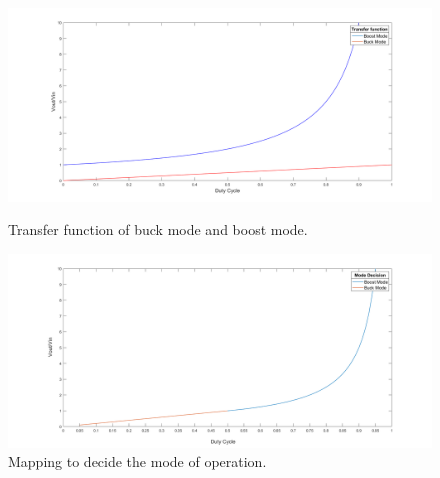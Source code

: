 \begin{figure}[H]
	\begin{minipage}[b]{0.8\linewidth}
		\centering
		\includegraphics[width=\textwidth]{../Pictures/transfer_function_buck_boost_mode}
		\caption{Transfer function of buck mode and boost mode.}
		\label{fig:tfmodes}
	\end{minipage}
	\hspace{0.5cm}
	\begin{minipage}[b]{0.8\linewidth}
		\centering
		\includegraphics[width=\textwidth]{../Pictures/Mode_decision_duty_vs_gain}
		\caption{Mapping to decide the mode of operation.}
		\label{fig:modedecisionmapping}
	\end{minipage}
\end{figure}


